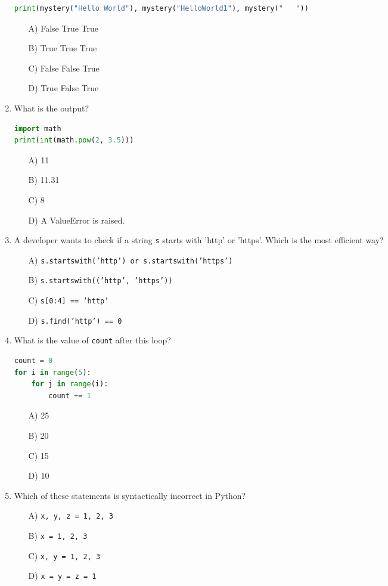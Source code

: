 \documentclass[9pt]{article}
\begin{document}
\begin{multicols}{2}
\begin{enumerate}
\begin{lstlisting}[language=Python]
print(mystery("Hello World"), mystery("HelloWorld1"), mystery("   "))
\end{lstlisting}
\begin{enumerate}
\item[A)] False True True
\item[B)] True True True
\item[C)] False False True
\item[D)] True False True
\end{enumerate}

\item What is the output?
\begin{lstlisting}[language=Python]
import math
print(int(math.pow(2, 3.5)))
\end{lstlisting}
\begin{enumerate}
\item[A)] 11
\item[B)] 11.31
\item[C)] 8
\item[D)] A ValueError is raised.
\end{enumerate}

\item A developer wants to check if a string \texttt{s} starts with 'http' or 'https'. Which is the most efficient way?
\begin{enumerate}
    \item[A)] \texttt{s.startswith('http') or s.startswith('https')}
    \item[B)] \texttt{s.startswith(('http', 'https'))}
    \item[C)] \texttt{s[0:4] == 'http'}
    \item[D)] \texttt{s.find('http') == 0}
\end{enumerate}

\item What is the value of \texttt{count} after this loop?
\begin{lstlisting}[language=Python]
count = 0
for i in range(5):
    for j in range(i):
        count += 1
\end{lstlisting}
\begin{enumerate}
\item[A)] 25
\item[B)] 20
\item[C)] 15
\item[D)] 10
\end{enumerate}

\item Which of these statements is syntactically incorrect in Python?
\begin{enumerate}
    \item[A)] \texttt{x, y, z = 1, 2, 3}
    \item[B)] \texttt{x = 1, 2, 3}
    \item[C)] \texttt{x, y = 1, 2, 3}
    \item[D)] \texttt{x = y = z = 1}
\end{enumerate}


\end{enumerate}
\end{multicols}
\end{document}
